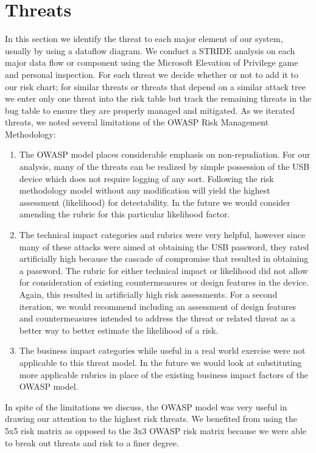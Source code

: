 \section{Threats}
\label{sec:threats}
In this section we identify the threat to each major element of our system,
usually by using a dataflow diagram.  We conduct a STRIDE analysis on each major
data flow or component using the Microsoft Elevation of Privilege game and
personal inspection. For each threat we
decide whether or not to add it to our risk chart; for similar threats or
threats that depend on a similar attack tree we enter only one threat into the
risk table but track the remaining threats in the bug table to ensure they are
properly managed and mitigated. As we iterated threats, we noted several
limitations of the OWASP Risk Management Methodology:
\begin{enumerate}
    \item{The OWASP model places considerable emphasis on non-repudiation.  For
our analysis, many of the threats can be realized by simple possession of the
USB device which does not require logging of any sort.  Following the risk
methodology model without any modification will yield the highest assessment
(likelihood) for detectability. In the future we would consider amending the
rubric for this particular likelihood factor.}
    \item{The technical impact categories and rubrics were very helpful, however
since many of these attacks were aimed at obtaining the USB password, they rated
artificially high because the cascade of compromise that resulted in obtaining a
password. The rubric for either technical impact or likelihood did not allow for
consideration of existing countermeasures or design features in the device.
Again, this resulted in artificially high risk assessments.  For a second
iteration, we would recommend including an assessment of design features and
countermeasures intended to address the threat or related threat as a better way
to better estimate the likelihood of a risk.}
    \item{The business impact categories while useful in a real world exercise
were not applicable to this threat model.  In the future we would look at
substituting more applicable rubrics in place of the existing business impact
factors of the OWASP model.}
\end{enumerate}

In spite of the limitations we discuss, the OWASP model was very useful in
drawing our attention to the highest risk threats.  We benefited from using the
5x5 risk matrix as opposed to the 3x3 OWASP risk matrix because we were able to
break out threats and risk to a finer degree.

